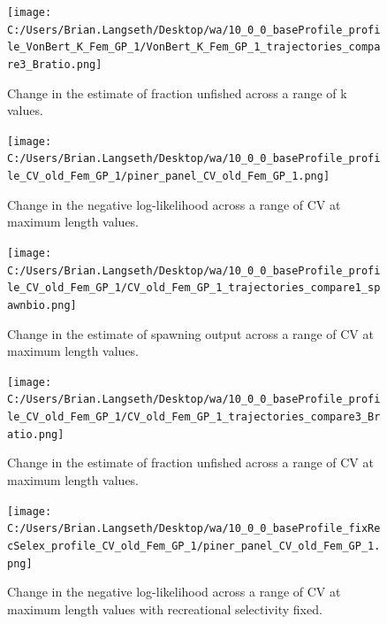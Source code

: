 \documentclass[11pt,
  english,
  letterpaper,
]{article}
\begin{document}
\tagmcend\tagstructend


\begin{figure}
\centering
\texttt{[image: C:/Users/Brian.Langseth/Desktop/wa/10\_0\_0\_baseProfile\_profile\_VonBert\_K\_Fem\_GP\_1/VonBert\_K\_Fem\_GP\_1\_trajectories\_compare3\_Bratio.png]}
\caption{Change in the estimate of fraction unfished across a range of k values.\label{fig:k-depl}}
\end{figure}

\tagmcend\tagstructend


\begin{figure}
\centering
\texttt{[image: C:/Users/Brian.Langseth/Desktop/wa/10\_0\_0\_baseProfile\_profile\_CV\_old\_Fem\_GP\_1/piner\_panel\_CV\_old\_Fem\_GP\_1.png]}
\caption{Change in the negative log-likelihood across a range of CV at maximum length values.\label{fig:cv2-profile}}
\end{figure}

\tagmcend\tagstructend


\begin{figure}
\centering
\texttt{[image: C:/Users/Brian.Langseth/Desktop/wa/10\_0\_0\_baseProfile\_profile\_CV\_old\_Fem\_GP\_1/CV\_old\_Fem\_GP\_1\_trajectories\_compare1\_spawnbio.png]}
\caption{Change in the estimate of spawning output across a range of CV at maximum length values.\label{fig:cv2-ssb}}
\end{figure}

\tagmcend\tagstructend


\begin{figure}
\centering
\texttt{[image: C:/Users/Brian.Langseth/Desktop/wa/10\_0\_0\_baseProfile\_profile\_CV\_old\_Fem\_GP\_1/CV\_old\_Fem\_GP\_1\_trajectories\_compare3\_Bratio.png]}
\caption{Change in the estimate of fraction unfished across a range of CV at maximum length values.\label{fig:cv2-depl}}
\end{figure}

\tagmcend\tagstructend


\begin{figure}
\centering
\texttt{[image: C:/Users/Brian.Langseth/Desktop/wa/10\_0\_0\_baseProfile\_fixRecSelex\_profile\_CV\_old\_Fem\_GP\_1/piner\_panel\_CV\_old\_Fem\_GP\_1.png]}
\caption{Change in the negative log-likelihood across a range of CV at maximum length values with recreational selectivity fixed.\label{fig:cv2-recfix-profile}}
\end{figure}
\end{document}
